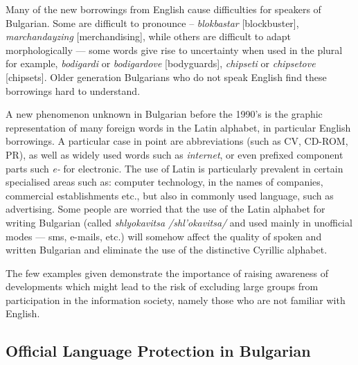 \documentclass[]{../../metanetpaper}
\begin{document}
\begin{multicols}{2}
Many of the new borrowings from English cause difficulties for speakers of Bulgarian. Some are difficult to pronounce – \textit{{blokbastar}} [blockbuster], \textit{{marchandayzing}} [merchandising], while others are difficult to adapt morphologically — some words give rise to uncertainty when used in the plural for example, \textit{{bodigardi}} or \textit{{bodigardove}} [bodyguards], \textit{{chipseti}} or \textit{{chipsetove}} [chipsets]. Older generation Bulgarians who do not speak English find these borrowings hard to understand. 

A new phenomenon unknown in Bulgarian before the 1990’s is the graphic representation of many foreign words in the Latin alphabet, in particular English borrowings. A particular case in point are abbreviations (such as CV, CD-ROM, PR), as well as widely used words such as \textit{internet}, or even prefixed component parts such \textit{e-} for electronic. The use of Latin is particularly prevalent in certain specialised areas such as: computer technology, in the names of companies, commercial establishments etc., but also in commonly used language, such as advertising. Some people are worried that the use of the Latin alphabet for writing Bulgarian (called \textit{{shlyokavitsa} /shl’okavitsa/} and used mainly in unofficial modes — sms, e-mails, etc.) \cite{shlyokavica} will somehow affect the quality of spoken and written Bulgarian and eliminate the use of the distinctive Cyrillic alphabet.

The few examples given demonstrate the importance of raising awareness of developments which might lead to the risk of excluding large groups from participation in the information society, namely those who are not familiar with English.

\subsection{Official Language Protection in Bulgarian}


\end{multicols}
\end{document}
